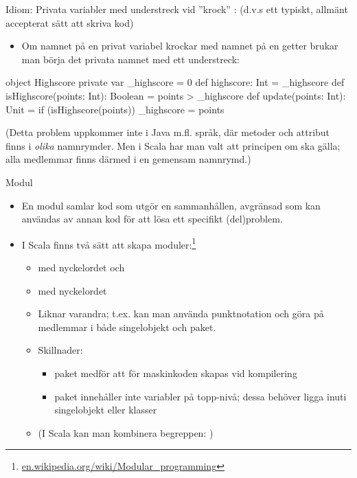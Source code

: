 \begin{Slide}{Idiom: Privata variabler med understreck vid ''krock''}\SlideFontSmall
{}: (d.v.s ett typiskt, allmänt accepterat sätt att skriva kod)
\begin{itemize}
  \item Om namnet på en privat variabel krockar med namnet på en getter
  brukar man börja det privata namnet med ett understreck:
\end{itemize}

\begin{CodeSmall}
object Highscore {
  private var _highscore = 0
  def highscore: Int = _highscore
  def isHighscore(points: Int): Boolean = points > _highscore
  def update(points: Int): Unit = if (isHighscore(points)) _highscore = points
}
\end{CodeSmall}

\pause

(Detta problem uppkommer inte i Java m.fl. språk, där metoder och attribut finns i \emph{olika} namnrymder.
Men i Scala har man valt att principen om  ska gälla; alla medlemmar finns därmed i en gemensam namnrymd.)

\end{Slide}


\begin{Slide}{Modul}

\begin{itemize}
  \item En modul samlar kod som utgör en sammanhållen, avgränsad  som kan användas av annan kod  för att lösa ett specifikt (del)problem.
  \item I Scala finns två sätt att skapa moduler:\footnote{\href{https://en.wikipedia.org/wiki/Modular_programming}{en.wikipedia.org/wiki/Modular\_programming}}
  \begin{itemize}
    \item {} med nyckelordet  och
    \item {} med nyckelordet 
    \pause
    \item Liknar varandra; t.ex. kan man använda punktnotation och göra  på medlemmar i både singelobjekt och paket.
    \pause
    \item Skillnader:
    \begin{itemize}
      \item paket medför att  för maskinkoden skapas vid kompilering
      \item paket innehåller inte variabler på topp-nivå; dessa behöver ligga inuti singelobjekt eller klasser
    \end{itemize}
    \item (I Scala kan man kombinera begreppen: )
  \end{itemize}

\end{itemize}
\end{Slide}





